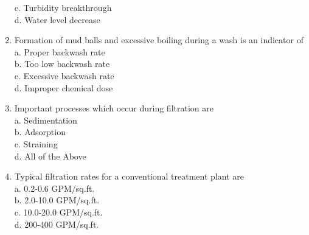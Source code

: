 \begin{enumerate}
c. Turbidity breakthrough\\
d. Water level decrease\\
\item Formation of mud balls and excessive boiling during a wash is an indicator of\\
a. Proper backwash rate\\
b. Too low backwash rate\\
c. Excessive backwash rate\\
d. Improper chemical dose\\
\item Important processes which occur during filtration are\\
a. Sedimentation\\
b. Adsorption\\
c. Straining\\
d. All of the Above\\
\item Typical filtration rates for a conventional treatment plant are\\
a. 0.2-0.6 GPM/sq.ft.\\
b. 2.0-10.0 GPM/sq.ft.\\
c. 10.0-20.0 GPM/sq.ft.\\
d. 200-400 GPM/sq.ft.


\end{enumerate}
